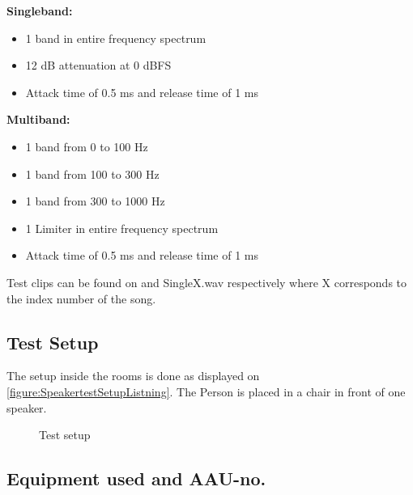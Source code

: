 \noindent\begin{minipage}[t]{0.5\linewidth}
    \textbf{Singleband:}
    \begin{itemize}
    \item 1 band in entire frequency spectrum
    \item 12 dB attenuation at 0 dBFS
    \item Attack time of 0.5 ms and release time of 1 ms
    \end{itemize}
    \end{minipage}%
    \begin{minipage}[t]{0.5\linewidth}
    \textbf{Multiband:}
    \begin{itemize}
    \item 1 band from 0 to 100 Hz
    \item 1 band from 100 to 300 Hz
    \item 1 band from 300 to 1000 Hz
    \item 1 Limiter in entire frequency spectrum
    \item Attack time of 0.5 ms and release time of 1 ms
    \end{itemize}
\end{minipage}\par\bigskip
Test clips can be found on  and SingleX.wav respectively where X corresponds to the index number of the song.



\subsection*{Test Setup}
The setup inside the rooms is done as displayed on \autoref{figure:SpeakertestSetupListning}. The Person is placed in a chair in front of one speaker.
\begin{figure}[H]
\centering
{}
\caption{Test setup}
\label{figure:SpeakertestSetupListning}
\end{figure}

\subsection*{Equipment used and AAU-no.}

